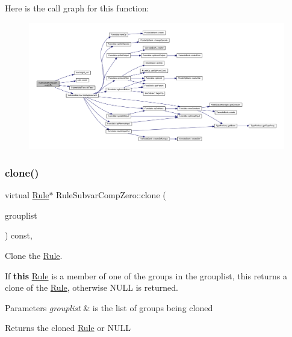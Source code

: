 Here is the call graph for this function\+:
\nopagebreak
\begin{figure}[H]
\begin{center}
\leavevmode
\includegraphics[width=350pt]{class_rule_subvar_comp_zero_a4875048b2b35720b88c6dd2667c4164b_cgraph}
\end{center}
\end{figure}
\mbox{\label{class_rule_subvar_comp_zero_a4a65d70ce76be64204bd88520d768a79}} 
\subsubsection{\texorpdfstring{clone()}{clone()}}
{\footnotesize\ttfamily virtual \mbox{\hyperlink{class_rule}{Rule}}$\ast$ Rule\+Subvar\+Comp\+Zero\+::clone (\begin{DoxyParamCaption}\item[{const \mbox{\hyperlink{class_action_group_list}{Action\+Group\+List}} \&}]{grouplist }\end{DoxyParamCaption}) const\hspace{0.3cm}{\ttfamily [inline]}, {\ttfamily [virtual]}}



Clone the \mbox{\hyperlink{class_rule}{Rule}}. 

If {\bfseries{this}} \mbox{\hyperlink{class_rule}{Rule}} is a member of one of the groups in the grouplist, this returns a clone of the \mbox{\hyperlink{class_rule}{Rule}}, otherwise N\+U\+LL is returned. 
\begin{DoxyParams}{Parameters}
{\em grouplist} & is the list of groups being cloned \\
\hline
\end{DoxyParams}
\begin{DoxyReturn}{Returns}
the cloned \mbox{\hyperlink{class_rule}{Rule}} or N\+U\+LL 
\end{DoxyReturn}


